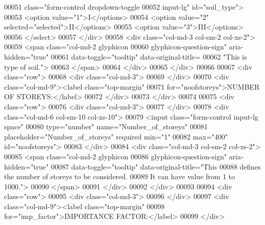 \begin{DoxyCode}
00051                            class="form-control dropdown-toggle 
00052                             input-lg" id="soil\_type">
00053                             <option value="1">I</options>
00054                             <option value="2" selected="selected">II</options>
00055                             <option value="3">III</options>
00056                         </select>
00057                     </div>
00058                     <div class="col-md-3 col-sm-2 col-xs-2">
00059                         <span class="col-md-2 glyphicon 
00060                             glyphicon-question-sign" aria-hidden="true" 
00061                             data-toggle="tooltip" data-original-title=
00062                             "This is type of soil.">
00063                         </span>
00064                     </div>
00065                 </div>
00066                 
00067                 <div class="row">
00068                     <div class="col-md-3">
00069                     </div>
00070                     <div class="col-md-9"><label class="top-margin"
00071                        for="noofstoreys">NUMBER OF STOREYS:</label>
00072                     </div>
00073                 </div>
00074                
00075                 <div class="row">
00076                     <div class="col-md-3">
00077                     </div>
00078                     <div class="col-md-6 col-sm-10 col-xs-10">
00079                         <input class="form-control input-lg space"
00080                         type="number" name="Number\_of\_storeys"
00081                         placeholder="Number\_of\_storeys" required min="1" 
00082                         max="400" id="noofstoreys">
00083                     </div>
00084                     <div class="col-md-3 col-sm-2 col-xs-2">
00085                         <span class="col-md-2 glyphicon 
00086                             glyphicon-question-sign" aria-hidden="true" 
00087                         data-toggle="tooltip" data-original-title="This
00088                         defines the number of storeys to be considered.
00089                         It can have value from 1 to 1000.">
00090                         </span>
00091                     </div>
00092                </div>
00093                 
00094                 <div class="row">
00095                     <div class="col-md-3">
00096                     </div>
00097                     <div class="col-md-9"><label class="top-margin"
00098                        for="imp\_factor">IMPORTANCE FACTOR:</label>
00099                     </div>

\end{DoxyCode}
